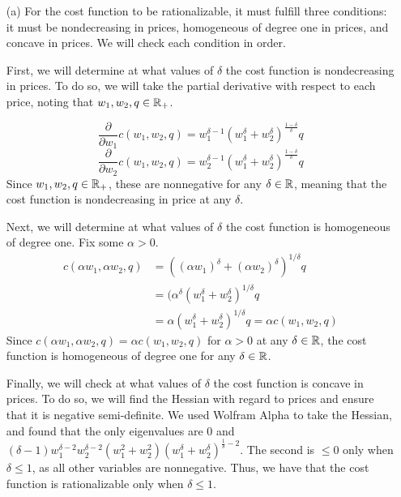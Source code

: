 \documentclass[12pt]{article}
\begin{document}
\begin{itemize}
    \item[(a)] For the cost function to be rationalizable, it must fulfill three conditions: it must be nondecreasing in prices, homogeneous of degree one in prices, and concave in prices. We will check each condition in order.

    \medskip

    First, we will determine at what values of $\delta$ the cost function is nondecreasing in prices. To do so, we will take the partial derivative with respect to each price, noting that $w_1,w_2,q \in \mathbb{R}_+$.

    \[
    \frac{\partial}{\partial w_1} c(w_1,w_2,q) = w_1^{\delta - 1} (w^\delta_1 + w^\delta_2)^{\frac{1-\delta}{\delta}}q
    \]
    \[
    \frac{\partial}{\partial w_2} c(w_1,w_2,q) = w_2^{\delta - 1} (w^\delta_1 + w^\delta_2)^{\frac{1-\delta}{\delta}}q
    \]
    Since $w_1,w_2,q \in \mathbb{R}_+$, these are nonnegative for any $\delta \in \mathbb{R}$, meaning that the cost function is nondecreasing in price at any $\delta$.

    \medskip

    Next, we will determine at what values of $\delta$ the cost function is homogeneous of degree one. Fix some $\alpha > 0$.
    \begin{align*}
        c(\alpha w_1,\alpha w_2,q) &= ((\alpha w_1)^\delta + (\alpha w_2)^\delta)^{1/\delta} q \\
        &= (\alpha^\delta (w_1^\delta + w_2^\delta)^{1/\delta}q \\
        &= \alpha (w^\delta_1 + w^\delta_2)^{1/\delta} q = \alpha c(w_1,w_2,q)
    \end{align*}
    Since $c(\alpha w_1,\alpha w_2,q) = \alpha c(w_1,w_2,q)$ for $\alpha > 0$ at any $\delta \in \mathbb{R}$, the cost function is homogeneous of degree one for any $\delta \in \mathbb{R}$.

    \medskip

    Finally, we will check at what values of $\delta$ the cost function is concave in prices. To do so, we will find the Hessian with regard to prices and ensure that it is negative semi-definite. We used Wolfram Alpha to take the Hessian, and found that the only eigenvalues are 0 and $(\delta - 1)w_1^{\delta - 2}w_2^{\delta - 2}(w_1^2 + w_2^2)(w_1^\delta + w_2^\delta)^{\frac{1}{\delta} - 2}$. The second is $\le 0$ only when $\delta \le 1$, as all other variables are nonnegative. Thus, we have that the cost function is rationalizable only when $\delta \le 1$.


\end{itemize}
\end{document}
